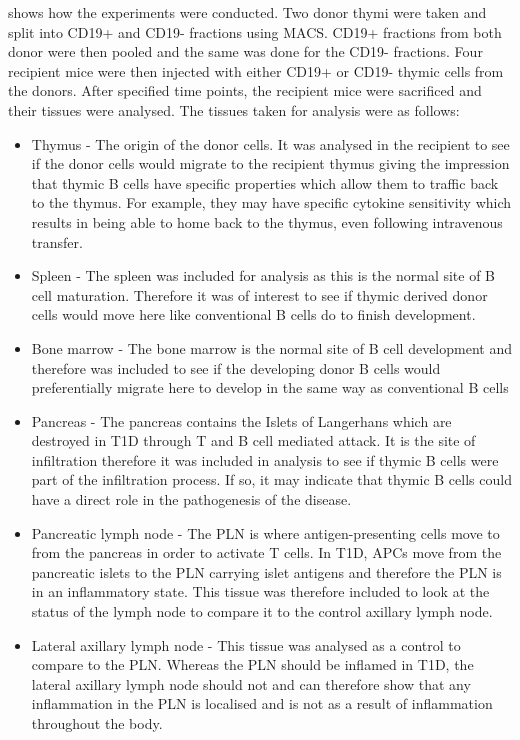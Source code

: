  shows how the experiments were conducted. 
Two donor thymi were taken and split into CD19+ and CD19- fractions using MACS.
CD19+ fractions from both donor were then pooled and the same was done for the CD19- fractions.
Four recipient mice were then injected with either CD19+ or CD19- thymic cells from the donors.
After specified time points, the recipient mice were sacrificed and their tissues were analysed.
The tissues taken for analysis were as follows:
\begin{itemize}
\item Thymus - The origin of the donor cells. It was analysed in the recipient to see if the donor cells would migrate to the recipient thymus giving the impression that thymic B cells have specific properties which allow them to traffic back to the thymus.
For example, they may have specific cytokine sensitivity which results in being able to home back to the thymus, even following intravenous transfer.
\item Spleen - The spleen was included for analysis as this is the normal site of B cell maturation.
Therefore it was of interest to see if thymic derived donor cells would move here like conventional B cells do to finish development.
\item Bone marrow - The bone marrow is the normal site of B cell development and therefore was included to see if the developing donor B cells would preferentially migrate here to develop in the same way as conventional B cells
\item Pancreas - The pancreas contains the Islets of Langerhans which are destroyed in T1D through T and B cell mediated attack.
It is the site of infiltration therefore it was included in analysis to see if thymic B cells were part of the infiltration process.
If so, it may indicate that thymic B cells could have a direct role in the pathogenesis of the disease.
\item Pancreatic lymph node - The PLN is where antigen-presenting cells move to from the pancreas in order to activate T cells.
In T1D, APCs move from the pancreatic islets to the PLN carrying islet antigens and therefore the PLN is in an inflammatory state.
This tissue was therefore included to look at the status of the lymph node to compare it to the control axillary lymph node.
\item Lateral axillary lymph node - This tissue was analysed as a control to compare to the PLN.
Whereas the PLN should be inflamed in T1D, the lateral axillary lymph node should not and can therefore show that any inflammation in the PLN is localised and is not as a result of inflammation throughout the body.
\end{itemize}



